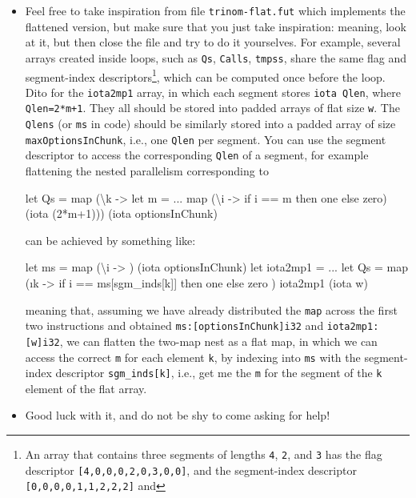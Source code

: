 \documentclass[a4paper,11pt]{article}
\begin{document}
\begin{itemize}
    \item[(3)] Feel free to take inspiration from file {\tt trinom-flat.fut}
        which implements the flattened version, but make sure that you
        just take inspiration: meaning, look at it, but then close the
        file and try to do it yourselves. For example, several arrays
        created inside loops, such as {\tt Qs}, {\tt Calls}, {\tt tmpss},
        share the same flag and segment-index descriptors\footnote{
            An array that contains three segments of lengths {\tt 4}, {\tt 2},
            and {\tt 3} has the flag descriptor {\tt [4,0,0,0,2,0,3,0,0]},
            and the segment-index descriptor {\tt [0,0,0,0,1,1,2,2,2]} and 
        }, which can be computed once before the loop. Dito for
        the {\tt iota2mp1} array, in which each segment stores {\tt iota Qlen},
        where {\tt Qlen=2*m+1}.
        They all should be stored into padded arrays of flat size {\tt w}.
        The {\tt Qlens} (or {\tt ms} in code) should be similarly stored
        into a padded array of size {\tt maxOptionsInChunk}, i.e., one {\tt Qlen}
        per segment.  You can use the segment descriptor to access
        the corresponding {\tt Qlen} of a segment, for example flattening
        the nested parallelism corresponding to 

\begin{fancycode}
   let Qs = map (\textbackslash{}k ->
                    let m = ...
                    map (\textbackslash{}i -> if i == m then one else zero) (iota (2*m+1)))
                (iota optionsInChunk)
\end{fancycode}

        can be achieved by something like:

\begin{fancycode}
  let ms       = map (\textbackslash{}i -> ) (iota optionsInChunk)
  let iota2mp1 = ...
  let Qs = map (\i k -> if i == ms[sgm_inds[k]] then one else zero 
               ) iota2mp1 (iota w)
\end{fancycode}

    meaning that, assuming we have already distributed the {\tt map} across the
    first two instructions and obtained {\tt ms:[optionsInChunk]i32} and
    {\tt iota2mp1:[w]i32}, we can flatten the two-map nest as a flat map,
    in which we can access the correct {\tt m} for each element {\tt k}, by indexing
    into {\tt ms} with the segment-index descriptor {\tt sgm\_inds[k]}, i.e.,
    get me the {\tt m} for the segment of the {\tt k} element of the flat array.

    \item[(4)] Good luck with it, and do not be shy to come asking for help!

\end{itemize}
\end{document}
